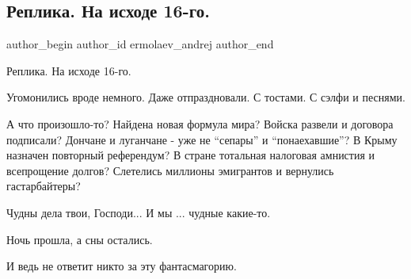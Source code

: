  
 
 
 
 
 
\subsection{Реплика. На исходе 16-го.}
\label{sec:16_02_2022.fb.ermolaev_andrej.1.replika}
 
\ifcmt
 author_begin
   author_id ermolaev_andrej
 author_end
\fi

Реплика. На исходе 16-го.

Угомонились вроде немного. Даже отпраздновали. С тостами. С сэлфи и песнями.

А что произошло-то? Найдена новая формула мира? Войска развели и договора
подписали? Дончане и луганчане - уже не \enquote{сепары} и \enquote{понаехавшие}? В Крыму
назначен повторный референдум? В стране тотальная налоговая амнистия и
всепрощение долгов? Слетелись миллионы эмигрантов и вернулись гастарбайтеры? 

Чудны дела твои, Господи... И мы ... чудные какие-то. 

Ночь прошла, а сны остались.

И ведь не ответит никто за эту фантасмагорию.

